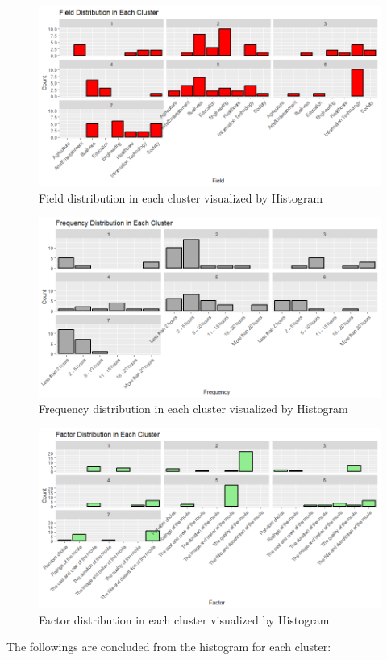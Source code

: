         \begin{figure}[H]
            \centering
            \includegraphics[scale=0.6]{graphics/gower/histogram/field distrib.png}
            \caption{Field distribution in each cluster visualized by Histogram}
        \end{figure}
        \begin{figure}[H]
            \centering
            \includegraphics[scale=0.6]{graphics/gower/histogram/freq distrib.png}
            \caption{Frequency distribution in each cluster visualized by Histogram}
        \end{figure}
        \begin{figure}[H]
            \centering
            \includegraphics[scale=0.6]{graphics/gower/histogram/factor distrib.png}
            \caption{Factor distribution in each cluster visualized by Histogram}
        \end{figure}
The followings are concluded from the histogram for each cluster:
\newline

